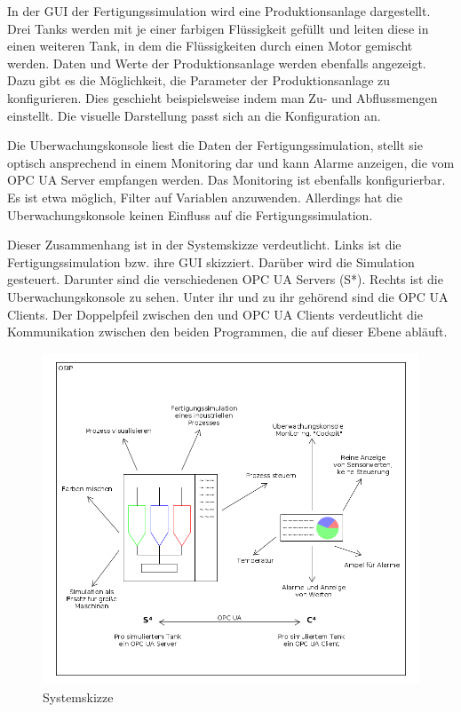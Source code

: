 \documentclass[parskip=full]{scrartcl}
\begin{document}
In der GUI der \gls{Fertigungssimulation} wird eine \gls{Produktionsanlage} dargestellt.
Drei Tanks werden mit je einer farbigen Flüssigkeit gefüllt und leiten diese in einen weiteren Tank,
in dem die Flüssigkeiten durch einen Motor gemischt werden. Daten und Werte der \gls{Produktionsanlage} werden ebenfalls angezeigt. Dazu gibt
es die Möglichkeit, die Parameter der \gls{Produktionsanlage} zu konfigurieren. Dies geschieht beispielsweise indem man Zu- und Abflussmengen
einstellt. Die visuelle Darstellung passt sich an die Konfiguration an.

Die \gls{Uberwachungskonsole} liest die Daten der \gls{Fertigungssimulation}, stellt sie optisch ansprechend in einem Monitoring dar
und kann Alarme anzeigen, die vom \gls{OPC UA Server} empfangen werden. Das Monitoring ist ebenfalls konfigurierbar. Es ist etwa möglich, Filter
auf Variablen anzuwenden. Allerdings hat die \gls{Uberwachungskonsole} keinen Einfluss auf die \gls{Fertigungssimulation}.

Dieser Zusammenhang ist in der Systemskizze verdeutlicht. Links ist die \gls{Fertigungssimulation} bzw. ihre \gls{GUI} skizziert.
Dar\"uber wird die Simulation gesteuert. Darunter sind die verschiedenen \glspl{OPC UA Server} (S*).
Rechts ist die \gls{Uberwachungskonsole} zu sehen. Unter ihr und zu ihr geh\"orend sind die \glspl{OPC UA Client}.
Der Doppelpfeil zwischen den  und \glspl{OPC UA Client} verdeutlicht die Kommunikation zwischen den beiden
Programmen, die auf dieser Ebene abl\"auft.

\begin{figure}[H]
  \centering
  \includegraphics[scale=0.5]{../system-sketch.png}
  \caption{Systemskizze}
\end{figure}
\end{document}
